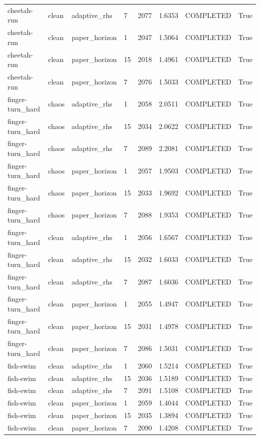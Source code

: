 \begin{tabular}{llllllll}
cheetah-run & clean & adaptive\_rhs & 7 & 2077 & 1.6353 & COMPLETED & True \\
cheetah-run & clean & paper\_horizon & 1 & 2047 & 1.5064 & COMPLETED & True \\
cheetah-run & clean & paper\_horizon & 15 & 2018 & 1.4961 & COMPLETED & True \\
cheetah-run & clean & paper\_horizon & 7 & 2076 & 1.5033 & COMPLETED & True \\
finger-turn\_hard & chaos & adaptive\_rhs & 1 & 2058 & 2.0511 & COMPLETED & True \\
finger-turn\_hard & chaos & adaptive\_rhs & 15 & 2034 & 2.0622 & COMPLETED & True \\
finger-turn\_hard & chaos & adaptive\_rhs & 7 & 2089 & 2.2081 & COMPLETED & True \\
finger-turn\_hard & chaos & paper\_horizon & 1 & 2057 & 1.9503 & COMPLETED & True \\
finger-turn\_hard & chaos & paper\_horizon & 15 & 2033 & 1.9692 & COMPLETED & True \\
finger-turn\_hard & chaos & paper\_horizon & 7 & 2088 & 1.9353 & COMPLETED & True \\
finger-turn\_hard & clean & adaptive\_rhs & 1 & 2056 & 1.6567 & COMPLETED & True \\
finger-turn\_hard & clean & adaptive\_rhs & 15 & 2032 & 1.6033 & COMPLETED & True \\
finger-turn\_hard & clean & adaptive\_rhs & 7 & 2087 & 1.6036 & COMPLETED & True \\
finger-turn\_hard & clean & paper\_horizon & 1 & 2055 & 1.4947 & COMPLETED & True \\
finger-turn\_hard & clean & paper\_horizon & 15 & 2031 & 1.4978 & COMPLETED & True \\
finger-turn\_hard & clean & paper\_horizon & 7 & 2086 & 1.5031 & COMPLETED & True \\
fish-swim & clean & adaptive\_rhs & 1 & 2060 & 1.5214 & COMPLETED & True \\
fish-swim & clean & adaptive\_rhs & 15 & 2036 & 1.5189 & COMPLETED & True \\
fish-swim & clean & adaptive\_rhs & 7 & 2091 & 1.5108 & COMPLETED & True \\
fish-swim & clean & paper\_horizon & 1 & 2059 & 1.4044 & COMPLETED & True \\
fish-swim & clean & paper\_horizon & 15 & 2035 & 1.3894 & COMPLETED & True \\
fish-swim & clean & paper\_horizon & 7 & 2090 & 1.4208 & COMPLETED & True \\

\end{tabular}
